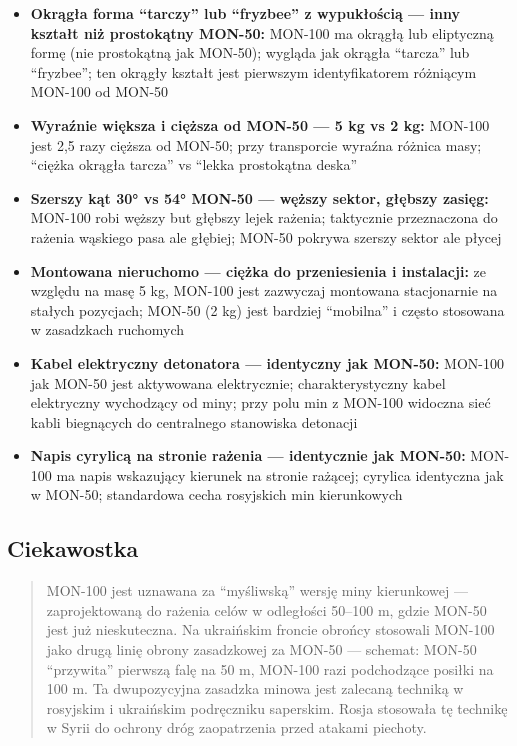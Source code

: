 \documentclass[12pt,oneside]{book}
\providecommand{\tightlist}{%
  \setlength{\itemsep}{0pt}\setlength{\parskip}{0pt}}
\begin{document}
\begin{itemize}
\tightlist
\item
  \textbf{Okrągła forma ``tarczy'' lub ``fryzbee'' z wypukłością ---
  inny kształt niż prostokątny MON-50:} MON-100 ma okrągłą lub
  eliptyczną formę (nie prostokątną jak MON-50); wygląda jak okrągła
  ``tarcza'' lub ``fryzbee''; ten okrągły kształt jest pierwszym
  identyfikatorem różniącym MON-100 od MON-50
\item
  \textbf{Wyraźnie większa i cięższa od MON-50 --- 5 kg vs 2 kg:}
  MON-100 jest 2,5 razy cięższa od MON-50; przy transporcie wyraźna
  różnica masy; ``ciężka okrągła tarcza'' vs ``lekka prostokątna deska''
\item
  \textbf{Szerszy kąt 30° vs 54° MON-50 --- węższy sektor, głębszy
  zasięg:} MON-100 robi węższy but głębszy lejek rażenia; taktycznie
  przeznaczona do rażenia wąskiego pasa ale głębiej; MON-50 pokrywa
  szerszy sektor ale płycej
\item
  \textbf{Montowana nieruchomo --- ciężka do przeniesienia i
  instalacji:} ze względu na masę 5 kg, MON-100 jest zazwyczaj montowana
  stacjonarnie na stałych pozycjach; MON-50 (2 kg) jest bardziej
  ``mobilna'' i często stosowana w zasadzkach ruchomych
\item
  \textbf{Kabel elektryczny detonatora --- identyczny jak MON-50:}
  MON-100 jak MON-50 jest aktywowana elektrycznie; charakterystyczny
  kabel elektryczny wychodzący od miny; przy polu min z MON-100 widoczna
  sieć kabli biegnących do centralnego stanowiska detonacji
\item
  \textbf{Napis cyrylicą na stronie rażenia --- identycznie jak MON-50:}
  MON-100 ma napis wskazujący kierunek na stronie rażącej; cyrylica
  identyczna jak w MON-50; standardowa cecha rosyjskich min kierunkowych
\end{itemize}

\subsection{Ciekawostka}\label{ciekawostka-128}

\begin{quote}
MON-100 jest uznawana za ``myśliwską'' wersję miny kierunkowej ---
zaprojektowaną do rażenia celów w odległości 50--100 m, gdzie MON-50
jest już nieskuteczna. Na ukraińskim froncie obrońcy stosowali MON-100
jako drugą linię obrony zasadzkowej za MON-50 --- schemat: MON-50
``przywita'' pierwszą falę na 50 m, MON-100 razi podchodzące posiłki na
100 m. Ta dwupozycyjna zasadzka minowa jest zalecaną techniką w
rosyjskim i ukraińskim podręczniku saperskim. Rosja stosowała tę
technikę w Syrii do ochrony dróg zaopatrzenia przed atakami piechoty.
\end{quote}
\end{document}
